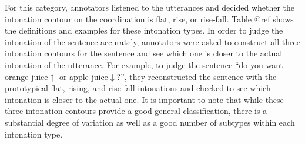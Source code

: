 \documentclass[oneside]{report}
\theoremstyle{definition}
\theoremstyle{definition}
\theoremstyle{definition}
\theoremstyle{remark}
\begin{document}
For this category, annotators listened to the utterances and decided
whether the intonation contour on the coordination is flat, rise, or
rise-fall. Table @ref\label{tab:intonationTypes} shows the definitions and
examples for these intonation types. In order to judge the intonation of
the sentence accurately, annotators were asked to construct all three
intonation contours for the sentence and see which one is closer to the
actual intonation of the utterance. For example, to judge the sentence
``do you want orange juice\(\uparrow\) or apple juice\(\downarrow\)?'',
they reconstructed the sentence with the prototypical flat, rising, and
rise-fall intonations and checked to see which intonation is closer to
the actual one. It is important to note that while these three
intonation contours provide a good general classification, there is a
substantial degree of variation as well as a good number of subtypes
within each intonation type.
\end{document}
